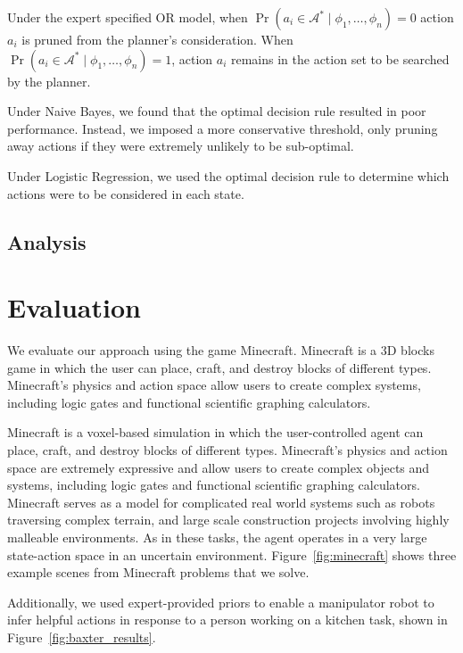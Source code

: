 \documentclass[11pt]{article}
\begin{document}
Under the expert specified OR model, when $\Pr(a_i \in \mathcal{A}^*  \mid \phi_1, \ldots, \phi_n) = 0$
action $a_i$ is pruned from the planner's consideration. When
$\Pr(a_i \in \mathcal{A}^*  \mid \phi_1, \ldots, \phi_n) = 1$,
action $a_i$ remains in the action set to be searched by the planner.

Under Naive Bayes, we found that the optimal decision rule resulted in poor performance. Instead, we imposed a more conservative threshold, only pruning away actions if they were extremely unlikely to be sub-optimal.

Under Logistic Regression, we used the optimal decision rule to determine which actions were to be considered in each state.

\subsection{Analysis}

\section{Evaluation}
\label{sec:evaluation}

We evaluate our approach using the game Minecraft. Minecraft is a 3D blocks game in which the
user can place, craft, and destroy blocks of different types.
Minecraft's physics and action space allow users to create complex
systems, including logic gates and functional scientific graphing
calculators.

Minecraft is a voxel-based simulation in which the user-controlled agent can place, craft, and destroy blocks of different types.
Minecraft's physics and action space are extremely expressive and allow users to create complex objects and systems, including logic gates and functional scientific graphing calculators.
Minecraft serves as a model for complicated real world systems such as robots traversing complex terrain, and large scale construction projects involving highly malleable environments.  As in these tasks, the agent operates in a very large state-action space in an uncertain environment. Figure~\ref{fig:minecraft} shows three example scenes from Minecraft problems that we solve.

Additionally, we used expert-provided priors to
enable a manipulator robot to infer helpful actions in response to a
person working on a kitchen task, shown in Figure~\ref{fig:baxter_results}.
\end{document}
